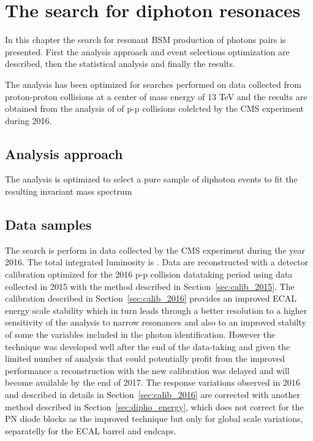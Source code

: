 \chapter{The search for diphoton resonaces}
\label{chapter:diphotons}

In this chapter the search for resonant BSM production of photons pairs is presented.
First the analysis approach and event selections optimization are described, then
the statistical analysis and finally the results.

The analysis has been optimized for searches performed on data collected from proton-proton
collisions at a center of mass energy of 13 TeV and the results are obtained from the analysis
of \lumisix of p-p collisions colelcted by the CMS experiment during 2016. 


\section{Analysis approach}
The analysis is optimized to select a pure sample of diphoton events to fit the resulting
invariant mass spectrum  

\section{Data samples}
\label{sec:diphotons_data_samples}
The search is perform in data collected by the CMS experiment during the year 2016. The total
integrated luminosity is \lumisix. Data are reconstructed with a detector calibration optimized
for the 2016 p-p collision datataking period using data collected in 2015 with the method described in
Section~\ref{sec:calib_2015}. The calibration described in Section~\ref{sec:calib_2016}
provides an improved ECAL energy scale stability which in turn leads through a better resolution
to a higher sensitivity of the analysis to narrow resonances and also to an improved stabilty
of some the variables included in the photon identification. However the technique was developed
well after the end of the data-taking and given the limited number of analysis that could potentially
profit from the improved performance a reconstruction with the new calibration was delayed and will become
available by the end of 2017. The response variations observed in 2016 and described in details in Section~\ref{sec:calib_2016}
are corrected with another method described in Section~\ref{sec:dipho_energy},
which does not correct for the PN diode blocks as the improved technique but only for global scale variations, separatelly
for the ECAL barrel and endcaps.

